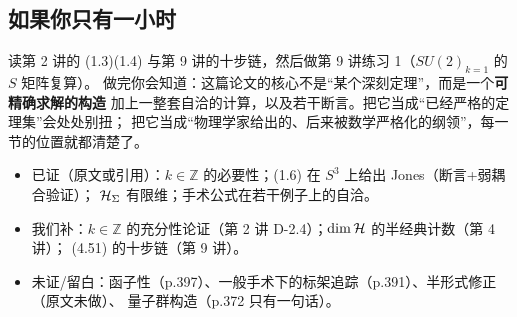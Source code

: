 \subsection{如果你只有一小时}
读第 2 讲的 (1.3)(1.4) 与第 9 讲的十步链，然后做第 9 讲练习 1（$SU(2)_{k=1}$ 的 $S$ 矩阵复算）。
做完你会知道：这篇论文的核心不是“某个深刻定理”，而是一个\textbf{可精确求解的构造}
加上一整套自洽的计算，以及若干断言。把它当成“已经严格的定理集”会处处别扭；
把它当成“物理学家给出的、后来被数学严格化的纲领”，每一节的位置就都清楚了。

\begin{boundary}
\begin{itemize}
  \item 已证（原文或引用）：$k\in\mathbb Z$ 的必要性；(1.6) 在 $S^3$ 上给出 Jones（断言+弱耦合验证）；
        $\mathcal{H}_\Sigma$ 有限维；手术公式在若干例子上的自洽。
  \item 我们补：$k\in\mathbb Z$ 的充分性论证（第 2 讲 D-2.4）；$\dim\mathcal{H}$ 的半经典计数（第 4 讲）；
        (4.51) 的十步链（第 9 讲）。
  \item 未证/留白：函子性（p.397）、一般手术下的标架追踪（p.391）、半形式修正（原文未做）、
        量子群构造（p.372 只有一句话）。
\end{itemize}
\end{boundary}
